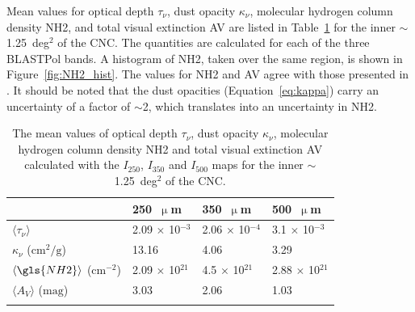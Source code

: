 Mean values for optical depth $\tau_{\nu}$, dust opacity $\kappa_{\nu}$, molecular hydrogen column density \gls{NH2}, and total visual extinction \gls{AV} are listed in Table~\ref{table:NH2_fit} for the inner $\sim$1.25~deg$^{2}$ of the CNC. The quantities are calculated for each of the three BLASTPol bands. A histogram of \gls{NH2}, taken over the same region, is shown in Figure~\ref{fig:NH2_hist}. The values for \gls{NH2} and \gls{AV} agree with those presented in \citet{preibisch2012herschel}. It should be noted that the dust opacities (Equation~\ref{eq:kappa}) carry an uncertainty of a factor of $\sim$2, which translates into an uncertainty in \gls{NH2}.


\begin{table}[!htbp]
  \centering
\begin{tabular}{@{}llll@{}}
\dtoprule
      & 250~$\upmu$m                              & 350~$\upmu$m       & 500~$\upmu$m              \\ \midrule
$\langle \tau_{\nu}  \rangle$  & 2.09 $\times$ 10$^{-3}$ & 2.06 $\times$ 10$^{-4}$ & 3.1 $\times$ 10$^{-3}$  \\
$\kappa_{\nu}$ ($\mathrm{cm}^{2}/\mathrm{g}$)    & 13.16             & 4.06     & 3.29                    \\
$\langle \gls{NH2}  \rangle$  ($\mathrm{cm}^{-2}$) & 2.09 $\times$ 10$^{21}$                 & 4.5 $\times$ 10$^{21}$                 & 2.88 $\times$ 10$^{21}$ \\
$\langle A_{V} \rangle$  ($\mathrm{mag}$)                              & 3.03                   & 2.06                   & 1.03                    \\ \bottomrule
\\
\end{tabular}
\centering
\caption[~Estimated map parameters calculated using total intensity maps over the inner  of the CNC.]{The mean values of optical depth $\tau_{\nu}$, dust opacity $\kappa_{\nu}$, molecular hydrogen column density \gls{NH2} and total visual extinction \gls{AV} calculated with the $I_{250}$, $I_{350}$ and $I_{500}$ maps for the inner $\sim$1.25~deg$^{2}$ of the CNC.}
\label{table:NH2_fit}
\end{table}

